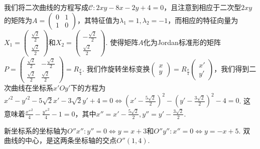 \begin{solution}
\begin{inparaenum}[(a)]
    \item 我们将二次曲线的方程写成$\mathscr C:2xy-8x-2y+4=0$，且注意到相应于二次型$2xy$的矩阵为$A=\begin{pmatrix}
          0 & 1 \\
          1 & 0
        \end{pmatrix}$，其特征值为$\lambda_1=1,\lambda_2=-1$，而相应的特征向量为$X_1=\begin{pmatrix}
          \frac{\sqrt2}2 \\
          \frac{\sqrt2}2
        \end{pmatrix}$和$X_2=\begin{pmatrix}
          -\frac{\sqrt2}2 \\
          \frac{\sqrt2}2
        \end{pmatrix}$. 使得矩阵$A$化为Jordan标准形的矩阵$P=\begin{pmatrix}
            \frac{\sqrt2}2 & -\frac{\sqrt2}2 \\
            \frac{\sqrt2}2 & \frac{\sqrt2}2
          \end{pmatrix}=R_{\frac\pi4}$. 我们作旋转坐标变换$\begin{pmatrix}
            x \\
            y
          \end{pmatrix}=R_{\frac\pi4}
          \begin{pmatrix}
            x' \\
            y'
          \end{pmatrix}$，我们得到二次曲线在坐标系$x'Oy'$下的方程为$x'^2-y'^2-5\sqrt2x'-3\sqrt2y'+4=0\Leftrightarrow
          \left(x'-\frac{5\sqrt2}2\right)^2-
          \left(y'-\frac{3\sqrt2}2\right)^2-4=0$. 这意味着$\frac{x''^2}4-\frac{y''^2}4-1=0$，其中$x''=x'-\frac{5\sqrt2}2,y''=y'-\frac{3\sqrt2}2$.

          新坐标系的坐标轴为$O''x'':y''=0\Leftrightarrow y=x+3$和$O''y'':x''=0\Leftrightarrow y=-x+5$. 双曲线的中心，是这两条坐标轴的交点$O''(1,4)$.
  \end{inparaenum}
\end{solution}

